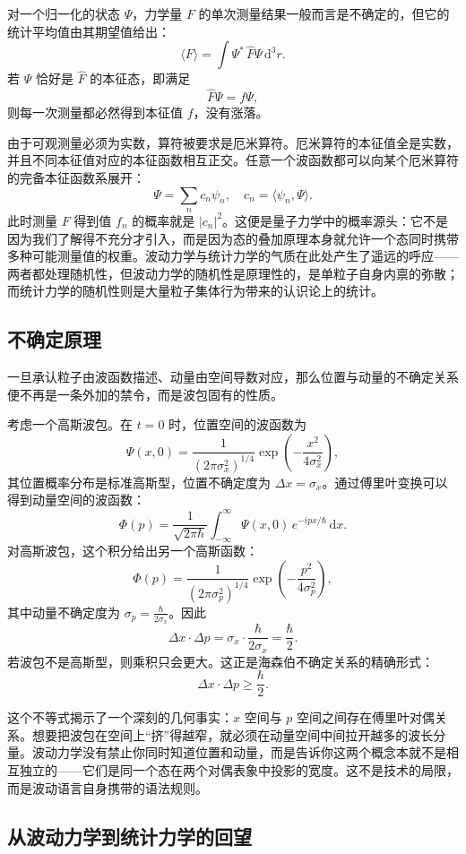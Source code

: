 \documentclass[UTF8]{ctexbook}
\begin{document}
对一个归一化的状态 $\Psi$，力学量 $F$ 的单次测量结果一般而言是不确定的，但它的统计平均值由其期望值给出：
\[
\langle F \rangle = \int \Psi^* \, \hat{F} \Psi \,\mathrm{d}^3r.
\]
若 $\Psi$ 恰好是 $\hat{F}$ 的本征态，即满足
\[
\hat{F} \Psi = f \Psi,
\]
则每一次测量都必然得到本征值 $f$，没有涨落。

由于可观测量必须为实数，算符被要求是厄米算符。厄米算符的本征值全是实数，并且不同本征值对应的本征函数相互正交。任意一个波函数都可以向某个厄米算符的完备本征函数系展开：
\[
\Psi = \sum_n c_n \psi_n, \quad c_n = \langle \psi_n, \Psi \rangle.
\]
此时测量 $F$ 得到值 $f_n$ 的概率就是 $|c_n|^2$。这便是量子力学中的概率源头：它不是因为我们了解得不充分才引入，而是因为态的叠加原理本身就允许一个态同时携带多种可能测量值的权重。波动力学与统计力学的气质在此处产生了遥远的呼应——两者都处理随机性，但波动力学的随机性是原理性的，是单粒子自身内禀的弥散；而统计力学的随机性则是大量粒子集体行为带来的认识论上的统计。

\subsection{不确定原理}

一旦承认粒子由波函数描述、动量由空间导数对应，那么位置与动量的不确定关系便不再是一条外加的禁令，而是波包固有的性质。

考虑一个高斯波包。在 $t=0$ 时，位置空间的波函数为
\[
\Psi(x,0) = \frac{1}{(2\pi \sigma_x^2)^{1/4}} \exp\left( -\frac{x^2}{4\sigma_x^2} \right),
\]
其位置概率分布是标准高斯型，位置不确定度为 $\Delta x = \sigma_x$。通过傅里叶变换可以得到动量空间的波函数：
\[
\Phi(p) = \frac{1}{\sqrt{2\pi\hbar}} \int_{-\infty}^{\infty} \Psi(x,0) \, e^{-ipx/\hbar} \,\mathrm{d}x.
\]
对高斯波包，这个积分给出另一个高斯函数：
\[
\Phi(p) = \frac{1}{(2\pi \sigma_p^2)^{1/4}} \exp\left( -\frac{p^2}{4\sigma_p^2} \right),
\]
其中动量不确定度为 $\sigma_p = \frac{\hbar}{2\sigma_x}$。因此
\[
\Delta x \cdot \Delta p = \sigma_x \cdot \frac{\hbar}{2\sigma_x} = \frac{\hbar}{2}.
\]
若波包不是高斯型，则乘积只会更大。这正是海森伯不确定关系的精确形式：
\[
\Delta x \cdot \Delta p \ge \frac{\hbar}{2}.
\]

这个不等式揭示了一个深刻的几何事实：$x$ 空间与 $p$ 空间之间存在傅里叶对偶关系。想要把波包在空间上“挤”得越窄，就必须在动量空间中间拉开越多的波长分量。波动力学没有禁止你同时知道位置和动量，而是告诉你这两个概念本就不是相互独立的——它们是同一个态在两个对偶表象中投影的宽度。这不是技术的局限，而是波动语言自身携带的语法规则。

\subsection{从波动力学到统计力学的回望}
\end{document}
